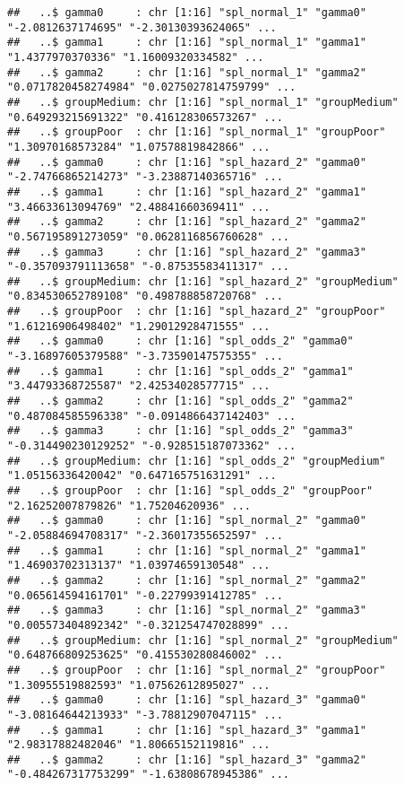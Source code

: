 \documentclass[
]{article}
\begin{document}
\begin{verbatim}
##   ..$ gamma0     : chr [1:16] "spl_normal_1" "gamma0" "-2.0812637174695" "-2.30130393624065" ...
##   ..$ gamma1     : chr [1:16] "spl_normal_1" "gamma1" "1.4377970370336" "1.16009320334582" ...
##   ..$ gamma2     : chr [1:16] "spl_normal_1" "gamma2" "0.0717820458274984" "0.0275027814759799" ...
##   ..$ groupMedium: chr [1:16] "spl_normal_1" "groupMedium" "0.649293215691322" "0.416128306573267" ...
##   ..$ groupPoor  : chr [1:16] "spl_normal_1" "groupPoor" "1.30970168573284" "1.07578819842866" ...
##   ..$ gamma0     : chr [1:16] "spl_hazard_2" "gamma0" "-2.74766865214273" "-3.23887140365716" ...
##   ..$ gamma1     : chr [1:16] "spl_hazard_2" "gamma1" "3.46633613094769" "2.48841660369411" ...
##   ..$ gamma2     : chr [1:16] "spl_hazard_2" "gamma2" "0.567195891273059" "0.0628116856760628" ...
##   ..$ gamma3     : chr [1:16] "spl_hazard_2" "gamma3" "-0.357093791113658" "-0.87535583411317" ...
##   ..$ groupMedium: chr [1:16] "spl_hazard_2" "groupMedium" "0.834530652789108" "0.498788858720768" ...
##   ..$ groupPoor  : chr [1:16] "spl_hazard_2" "groupPoor" "1.61216906498402" "1.29012928471555" ...
##   ..$ gamma0     : chr [1:16] "spl_odds_2" "gamma0" "-3.16897605379588" "-3.73590147575355" ...
##   ..$ gamma1     : chr [1:16] "spl_odds_2" "gamma1" "3.44793368725587" "2.42534028577715" ...
##   ..$ gamma2     : chr [1:16] "spl_odds_2" "gamma2" "0.487084585596338" "-0.0914866437142403" ...
##   ..$ gamma3     : chr [1:16] "spl_odds_2" "gamma3" "-0.314490230129252" "-0.928515187073362" ...
##   ..$ groupMedium: chr [1:16] "spl_odds_2" "groupMedium" "1.05156336420042" "0.647165751631291" ...
##   ..$ groupPoor  : chr [1:16] "spl_odds_2" "groupPoor" "2.16252007879826" "1.75204620936" ...
##   ..$ gamma0     : chr [1:16] "spl_normal_2" "gamma0" "-2.05884694708317" "-2.36017355652597" ...
##   ..$ gamma1     : chr [1:16] "spl_normal_2" "gamma1" "1.46903702313137" "1.03974659130548" ...
##   ..$ gamma2     : chr [1:16] "spl_normal_2" "gamma2" "0.065614594161701" "-0.22799391412785" ...
##   ..$ gamma3     : chr [1:16] "spl_normal_2" "gamma3" "0.005573404892342" "-0.321254747028899" ...
##   ..$ groupMedium: chr [1:16] "spl_normal_2" "groupMedium" "0.648766809253625" "0.415530280846002" ...
##   ..$ groupPoor  : chr [1:16] "spl_normal_2" "groupPoor" "1.30955519882593" "1.07562612895027" ...
##   ..$ gamma0     : chr [1:16] "spl_hazard_3" "gamma0" "-3.08164644213933" "-3.78812907047115" ...
##   ..$ gamma1     : chr [1:16] "spl_hazard_3" "gamma1" "2.98317882482046" "1.80665152119816" ...
##   ..$ gamma2     : chr [1:16] "spl_hazard_3" "gamma2" "-0.484267317753299" "-1.63808678945386" ...

\end{verbatim}
\end{document}
